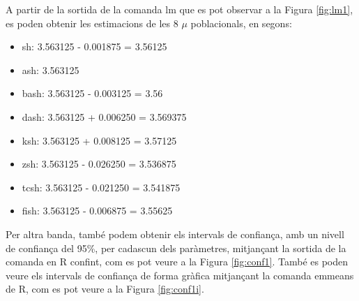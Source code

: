 \documentclass[12pt]{article}
\begin{document}
A partir de la sortida de la comanda lm que es pot observar a la Figura \ref{fig:lm1}, es poden obtenir les estimacions
de les 8 $\mu$ poblacionals, en segons:
\begin{itemize}
  \item sh: 3.563125 - 0.001875 = 3.56125
  \item ash: 3.563125
  \item bash: 3.563125 - 0.003125 = 3.56
  \item dash: 3.563125 + 0.006250 = 3.569375
  \item ksh: 3.563125 + 0.008125 = 3.57125
  \item zsh: 3.563125 - 0.026250 = 3.536875
  \item tcsh: 3.563125 - 0.021250 = 3.541875
  \item fish: 3.563125 - 0.006875 = 3.55625 
\end{itemize}
\hfill \break
Per altra banda, també podem obtenir els intervals de confiança, amb un nivell de confiança del 95\%, per cadascun dels paràmetres,
mitjançant la sortida de la comanda en R confint, com es pot veure a la Figura \ref{fig:conf1}. També es poden veure
els intervals de confiança de forma gràfica mitjançant la comanda emmeans de R, com es pot veure a la Figura \ref{fig:conf1i}.
\end{document}
